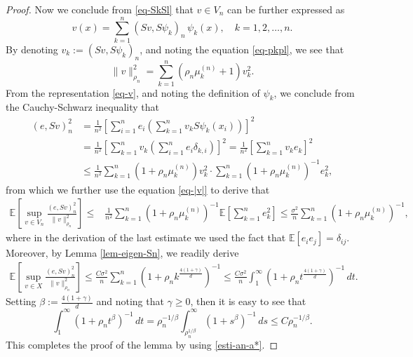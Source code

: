 \documentclass[11pt]{article}
\numberwithin{equation}{section}
\begin{document}
\begin{proof}
Now we conclude from \eqref{eq-SkSl} that $v\in V_n$ can be further expressed as
\begin{equation}\label{eq-v}
v(x) = \sum_{k=1}^n (Sv, S\psi_k)_n\, \psi_k(x),  \quad k = 1, 2, \ldots, n.
\end{equation}
By denoting $v_k := (Sv, S\psi_k)_n$, and noting the equation \eqref{eq-pkpl}, we see that
\begin{equation}\label{eq-|v|}
\|v\|_{\rho_n}^2 = \sum_{k=1}^n (\rho_n \mu_k^{(n)} + 1) v_k^2.
\end{equation}
From the representation \eqref{eq-v}, and noting the definition of $\psi_k$, we conclude from the Cauchy-Schwarz inequality that
\begin{align*}
(e, Sv)_n^2 &= \frac{1}{n^2}  \left[\sum_{i=1}^n e_i \left( \sum_{k=1}^n v_k S\psi_k(x_i) \right) \right]^2 \\
&= \frac{1}{n^2}  \left[\sum_{k=1}^n v_k \left( \sum_{i=1}^n e_i \delta_{k,i} \right) \right]^2
= \frac{1}{n^2}  \left[\sum_{k=1}^n v_k  e_k\right]^2 \\
&\leq \frac{1}{n^2} \sum_{k=1}^n (1 + \rho_n \mu_k^{(n)}) v_k^2 \cdot \sum_{k=1}^n (1 + \rho_n \mu_k^{(n)})^{-1}  e_k^2,
\end{align*}
from which we further use the equation  \eqref{eq-|v|} to derive that
\[
\begin{aligned}
\mathbb{E} \left[ \sup_{v \in V_n} \frac{(e, Sv)_n^2}{\|v\|_{\rho_n}^2} \right] \leq&\frac{1}{n^2} \sum_{k=1}^n (1 + \rho_n \mu_k^{(n)})^{-1} \mathbb{E} \left[\sum_{k=1}^n e_k^2 \right]
\leq \frac{\sigma^2} n \sum_{k=1}^n (1 + \rho_n \mu_k^{(n)})^{-1},
\end{aligned}
\]
where in the derivation of the last estimate we used the fact that $\mathbb{E}[e_i e_j] = \delta_{ij}$. Moreover, by Lemma \ref{lem-eigen-Sn}, we readily derive
\[
\begin{aligned}
\mathbb{E} \left[ \sup_{v \in X} \frac{(e, Sv)_n^2}{\|v\|_{\rho_n}^2} \right]
\leq \frac{C \sigma^2} n \sum_{k=1}^n (1 + \rho_n k^{\frac{4(1+\gamma)}{d}})^{-1}
\leq \frac{C \sigma^2} n \int_1^\infty (1 + \rho_n t^{\frac{4(1+\gamma)}{d}})^{-1} \, dt.
\end{aligned}
\]
Setting $\beta:={\frac{4(1+\gamma)}{d}}$ and noting that $\gamma\ge0$, then it is easy to see that
\[
\int_1^\infty (1 + \rho_n t^{\beta})^{-1} \, dt = \rho_n^{-1/\beta} \int_{\rho_n^{1/\beta}}^\infty (1 + s^\beta)^{-1} \, ds \leq C \rho_n^{-1/\beta}.
\]
This completes the proof of the lemma by using \eqref{esti-an-a*}.
\end{proof}
\end{document}

